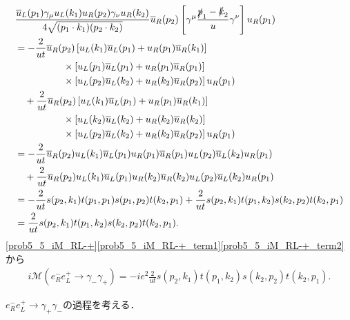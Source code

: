 \begin{align}
  \begin{split}
    & \frac{\overline{u}_L(p_1)\gamma_\mu u_L(k_1) u_R(p_2)\gamma_\nu u_R(k_2)}{4\sqrt{(p_1 \cdot k_1)(p_2 \cdot k_2)}} \overline{u}_R(p_2)
    \left[ \gamma^\mu \frac{\slashed{p}_1 - \slashed{k}_2}{u} \gamma^\nu \right] u_R(p_1) \\
    &= -\frac{2}{ut} \overline{u}_R(p_2) \left[ u_L(k_1)\overline{u}_L(p_1) + u_R(p_1)\overline{u}_R(k_1) \right] \\
    &\qquad\qquad\quad\times \left[ u_L(p_1)\overline{u}_L(p_1) + u_R(p_1)\overline{u}_R(p_1) \right] \\
    &\qquad\qquad\quad\times \left[ u_L(p_2)\overline{u}_L(k_2) + u_R(k_2)\overline{u}_R(p_2) \right] u_R(p_1) \\
    &\quad +\frac{2}{ut} \overline{u}_R(p_2) \left[ u_L(k_1)\overline{u}_L(p_1) + u_R(p_1)\overline{u}_R(k_1) \right] \\
    &\qquad\qquad\quad\times \left[ u_L(k_2)\overline{u}_L(k_2) + u_R(k_2)\overline{u}_R(k_2) \right] \\
    &\qquad\qquad\quad\times \left[ u_L(p_2)\overline{u}_L(k_2) + u_R(k_2)\overline{u}_R(p_2) \right] u_R(p_1) \\
    &= -\frac{2}{ut} \overline{u}_R(p_2) u_L(k_1)\overline{u}_L(p_1) u_R(p_1)\overline{u}_R(p_1) u_L(p_2)\overline{u}_L(k_2) u_R(p_1) \\
    &\quad +\frac{2}{ut} \overline{u}_R(p_2) u_L(k_1)\overline{u}_L(p_1) u_R(k_2)\overline{u}_R(k_2) u_L(p_2)\overline{u}_L(k_2) u_R(p_1) \\
    &= -\frac{2}{ut} s(p_2, k_1) t(p_1, p_1) s(p_1, p_2) t(k_2, p_1) + \frac{2}{ut} s(p_2, k_1) t(p_1, k_2) s(k_2, p_2) t(k_2, p_1) \\
    &= \frac{2}{ut} s(p_2, k_1) t(p_1, k_2) s(k_2, p_2) t(k_2, p_1) .
  \end{split}
  \label{prob5_5_iM_RL-+_term2}
\end{align}
\eqref{prob5_5_iM_RL-+}\eqref{prob5_5_iM_RL-+_term1}\eqref{prob5_5_iM_RL-+_term2}から
\begin{align}
  i\mathcal{M}(e^-_R e^+_L \to \gamma_-\gamma_+) = -ie^2 \frac{2}{ut} s(p_2, k_1) t(p_1, k_2) s(k_2, p_2) t(k_2, p_1) . \label{prob5_5_iM_RL-+_cal}
\end{align}

$e^-_R e^+_L \to \gamma_+\gamma_-$の過程を考える．

